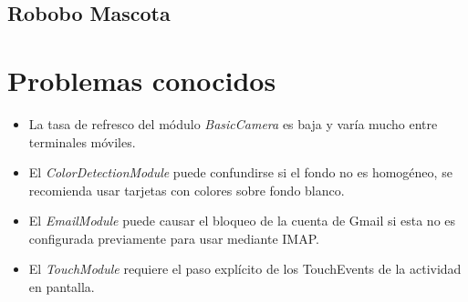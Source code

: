 \subsection{Robobo Mascota}


\section{Problemas conocidos}
\begin{itemize}
	\item La tasa de refresco del módulo \textit{BasicCamera} es baja y varía mucho entre terminales móviles.
	\item El \textit{ColorDetectionModule} puede confundirse si el fondo no es homogéneo, se recomienda usar tarjetas con colores sobre fondo blanco.
	\item El \textit{EmailModule} puede causar el bloqueo de la cuenta de Gmail si esta no es configurada previamente para usar mediante IMAP.
	\item El \textit{TouchModule} requiere el paso explícito de los TouchEvents de la actividad en pantalla.
\end{itemize}
\label{sec:known_issues}
    

